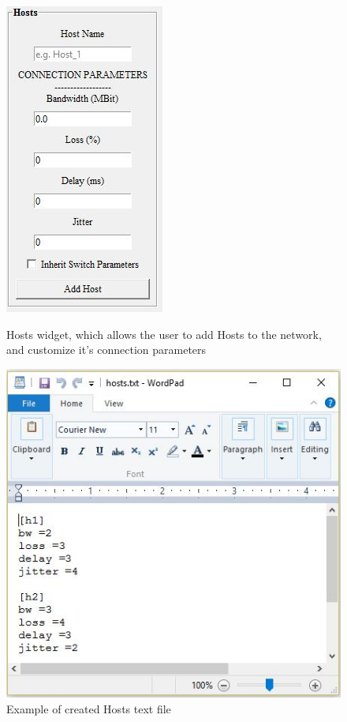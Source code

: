 \begin{figure}[H]
\centering
\begin{minipage}{.5\textwidth}
  \centering
  \includegraphics[width=.4\linewidth]{Hosts}
  \caption{Hosts widget, which allows the user to add Hosts to the network, and customize it's connection parameters}
  \label{fig:test1}
\end{minipage}%
\begin{minipage}{.5\textwidth}
  \centering
  \includegraphics[width=.8\linewidth]{hosts_txt}
  \caption{Example of created Hosts text file}
  \label{fig:test2}
\end{minipage}
\end{figure}

